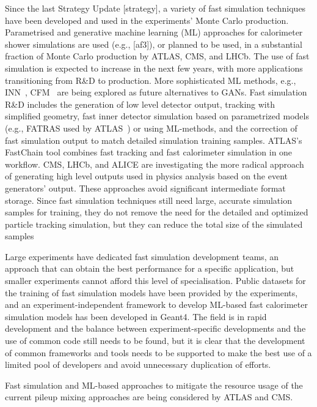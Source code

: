 \documentclass[10pt,a4paper]{article}
\begin{document}
Since the last Strategy Update {[}strategy{]}, a variety of fast
simulation techniques have been developed and used in the experiments'
Monte Carlo production. Parametrised and generative machine learning
(ML) approaches for calorimeter shower simulations are used (e.g.,
{[}af3{]}), or planned to be used, in a substantial fraction of Monte
Carlo production by ATLAS, CMS, and LHCb. The use of fast simulation is
expected to increase in the next few years, with more applications
transitioning from R\&D to production. More sophisticated ML methods,
e.g.,
INN~\cite{kim2021innmethodidentifyingcleanannotated},
CFM~\cite{tong2024improvinggeneralizingflowbasedgenerative}
are being explored as future alternatives to GANs. Fast simulation R\&D
includes the generation of low level detector output, tracking with
simplified geometry, fast inner detector simulation based on
parametrized models (e.g., FATRAS used by
ATLAS~\cite{fatras}) or using ML-methods,
and the correction of fast simulation output to match detailed
simulation training samples. ATLAS's FastChain tool combines fast
tracking and fast calorimeter simulation in one workflow. CMS, LHCb, and
ALICE are investigating the more radical approach of generating high
level outputs used in physics analysis based on the event
generators' output. These approaches avoid significant
intermediate format storage. Since fast simulation techniques still need
large, accurate simulation samples for training, they do not remove the
need for the detailed and optimized particle tracking simulation, but
they can reduce the total size of the simulated samples

Large experiments have dedicated fast simulation development teams, an
approach that can obtain the best performance for a specific
application, but smaller experiments cannot afford this level of
specialisation. Public datasets for the training of fast simulation
models have been provided by the experiments, and an
experiment-independent framework to develop ML-based fast calorimeter
simulation models has been developed in Geant4. The field is in rapid
development and the balance between experiment-specific developments and
the use of common code still needs to be found, but it is clear that the
development of common frameworks and tools needs to be supported to make
the best use of a limited pool of developers and avoid unnecessary
duplication of efforts.

Fast simulation and ML-based approaches to mitigate the resource usage
of the current pileup mixing approaches are being considered by ATLAS
and CMS.
\end{document}
